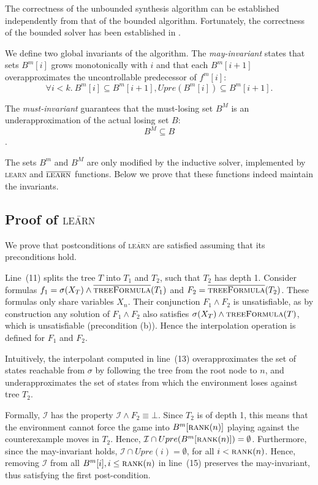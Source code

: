\documentclass{llncs}
\newcommand{\II}{\mathcal{I}}
\newcommand{\textoverline}[1]{$\overline{\mbox{#1}}$}
\begin{document}
The correctness of the unbounded synthesis algorithm can be established
independently from that of the bounded algorithm. Fortunately, the correctness
of the bounded solver has been established in \cite{narodytska2014}.

We define two global invariants of the algorithm.  The \emph{may-invariant}
states that sets $B^m[i]$ grows monotonically with $i$ and that each $B^m[i+1]$
overapproximates the uncontrollable predecessor of $f^m[i]$: $$\forall
i<k.~B^m[i] \subseteq B^m[i+1], Upre(B^m[i]) \subseteq B^m[i+1].$$

The \emph{must-invariant} guarantees that the must-losing set $B^M$ is an
underapproximation of the actual losing set $B$: $$B^M \subseteq B$$.

The sets $B^m$ and $B^M$ are only modified by the inductive solver, implemented
by \textsc{learn} and \textoverline{\textsc{learn}} functions.  Below we prove that these
functions indeed maintain the invariants.

\subsection{Proof of \textsc{\textoverline{learn}}}

We prove that postconditions of \textsc{\textoverline{learn}} are satisfied
assuming that its preconditions hold.

Line~(11) splits the tree $T$ into $T_1$ and $T_2$, such that $T_2$ has depth
1.  Consider formulas $f_1=\sigma(X_T) \land
\textsc{\textoverline{treeFormula}}(T_1)$ and $F_2 =
\textsc{\textoverline{treeFormula}}(T_2)$.  These formulas only share variables
$X_n$.  Their conjunction $F_1 \land F_2$ is unsatisfiable, as by construction
any solution of $F_1 \land F_2$ also satisfies $\sigma(X_T) \land
\textsc{treeFormula}(T)$, which is unsatisfiable (precondition (b)).  Hence the
interpolation operation is defined for $F_1$ and $F_2$.  

Intuitively, the interpolant computed in line~(13) overapproximates the set of
states reachable from $\sigma$ by following the tree from the root node to $n$,
and underapproximates the set of states from which the environment loses
against tree $T_2$.  

Formally, $\II$ has the property $\II \land F_2 \equiv \bot$.  Since $T_2$ is
of depth 1, this means that the environment cannot force the game into
$B^m[\textsc{rank}(n)]$ playing against the counterexample moves in $T_2$.
Hence, $\II \cap Upre(B^m[\textsc{rank}(n)]) = \emptyset$.  Furthermore, since
the may-invariant holds, $\II \cap Upre(i) = \emptyset$, for all $i <
\textsc{rank}(n)$.  Hence, removing $\II$ from all $B^m[i], i\leq
\textsc{rank}(n)$ in line~(15) preserves the may-invariant, thus satisfying the
first post-condition.
\end{document}
